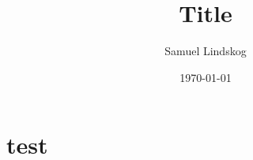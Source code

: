 \documentclass{article}
\begin{document}
\title{Title}
\author{Samuel Lindskog}
\date{\today}
\maketitle
\renewcommand{\abstractname}{}

\setcounter{secnumdepth}{2}

\section{test}
\end{document}
